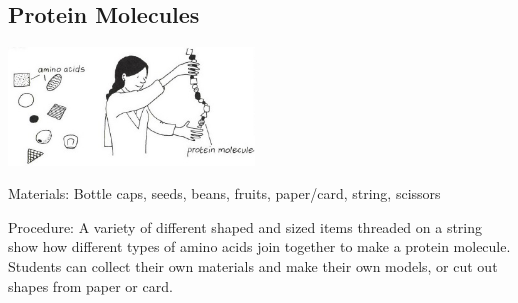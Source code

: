 \begin{multicols}{2}
\subsection{Protein Molecules} %

\begin{center}
\includegraphics[width=0.49\textwidth]{./img/vso/proteins.jpg}
\end{center}

\begin{description*}
\item[Materials:]{Bottle caps, seeds, beans, fruits, paper/card, string, scissors}
\item[Procedure:]{A variety of different shaped and
sized items threaded on a string
show how different types of
amino acids join together to
make a protein molecule.
Students can collect their own
materials and make their own
models, or cut out
shapes from paper or card.}
\end{description*}

%
%


\end{multicols}
